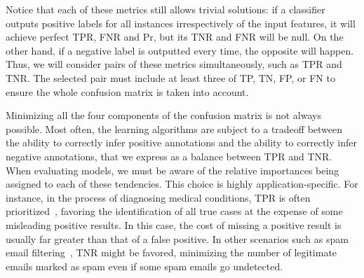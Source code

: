Notice that each of these metrics still allows trivial solutions: if a classifier outputs positive labels for all instances irrespectively of the input features, it will achieve perfect TPR, FNR and Pr, but its TNR and FNR will be null. On the other hand, if a negative label is outputted every time, the opposite will happen.
Thus, we will consider pairs of these metrics simultaneously, such as TPR and TNR.
The selected pair must include at least three of TP, TN, FP, or FN to ensure the whole confusion matrix is taken into account.

Minimizing all the four components of the confusion matrix is not always possible.
%
Most often, the learning algorithms are subject to a tradeoff between the ability to correctly infer positive annotations and the ability to correctly infer negative annotations, that we express as a balance between TPR and TNR. When evaluating models, we must be aware of the relative importances being assigned to each of these tendencies.
%
%
%
%
This choice is highly application-specific. For instance, in the process of diagnosing medical conditions, TPR is often prioritized~\cite{}, favoring the identification of all true cases at the expense of some misleading positive results.
In this case, the cost of missing a positive result is usually far greater than that of a false positive. In other scenarios such as spam email filtering~\cite{}, TNR might be favored, minimizing the number of legitimate emails marked as spam even if some spam emails go undetected.

